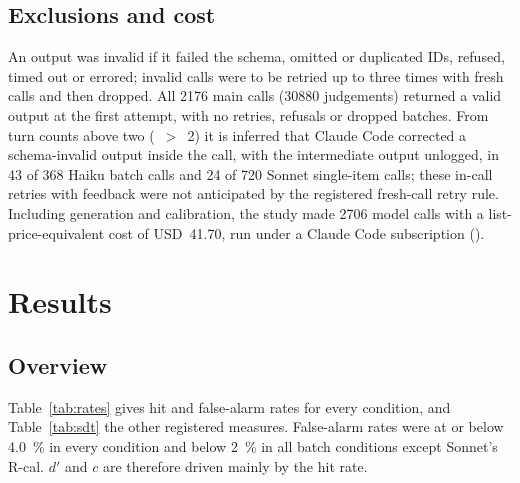 \documentclass[11pt]{article}
\begin{document}
\subsection{Exclusions and cost}\label{sec:exclusions}

An output was invalid if it failed the schema, omitted or duplicated IDs, refused, timed out or errored; invalid calls were to be retried up to three times with fresh calls and then dropped. All \num{2176} main calls (\num{30880} judgements) returned a valid output at the first attempt, with no retries, refusals or dropped batches. From turn counts above two (~$>$~2) it is inferred that Claude Code corrected a schema-invalid output inside the call, with the intermediate output unlogged, in 43 of 368 Haiku batch calls and 24 of 720 Sonnet single-item calls; these in-call retries with feedback were not anticipated by the registered fresh-call retry rule. Including generation and calibration, the study made \num{2706} model calls with a list-price-equivalent cost of USD~41.70, run under a Claude Code subscription ().

\section{Results}\label{sec:results}

\subsection{Overview}\label{sec:overview}

Table~\ref{tab:rates} gives hit and false-alarm rates for every condition, and Table~\ref{tab:sdt} the other registered measures. False-alarm rates were at or below \SI{4.0}{\percent} in every condition and below \SI{2}{\percent} in all batch conditions except Sonnet's R-cal. $d'$ and $c$ are therefore driven mainly by the hit rate.
\end{document}

